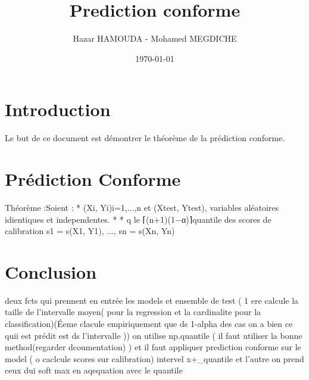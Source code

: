\documentclass[a4paper,12pt]{article}%
\title{Prediction conforme}
\author{Hazar HAMOUDA - Mohamed MEGDICHE}
\date{\today}
\begin{document}
\maketitle

\section{Introduction}
Le but de ce document est démontrer le théorème de la prédiction conforme.
\section{Prédiction Conforme}
Théorème :Soient : 
 * (Xi, Yi)i=1,...,n et (Xtest, Ytest), variables aléatoires idientiques et independentes.
 *
 * q le ⌈(n+1)(1−α)⌉quantile des scores de calibration s1 = s(X1, Y1), ..., sn = s(Xn, Yn)
\section{Conclusion}
deux fcts qui prennent en entrée les models et ensemble de test ( 1 ere calcule la taille de l'intervalle moyen( pour la regression et la cardinalite pour  la classification)(Éeme clacule empiriquement que ds 1-alpha des cas on a bien ce quii est prédit est ds l'intervalle ))
on utilise  np.quantile ( il faut utiliser la bonne method(regarder dcoumentation) )
et il faut appliquer prediction conforme sur le model ( o caclcule scores sur calibration)
intervel x+_quantile et l'autre on prend ceux dui soft max en aqequation avec le quantile
\end{document}
